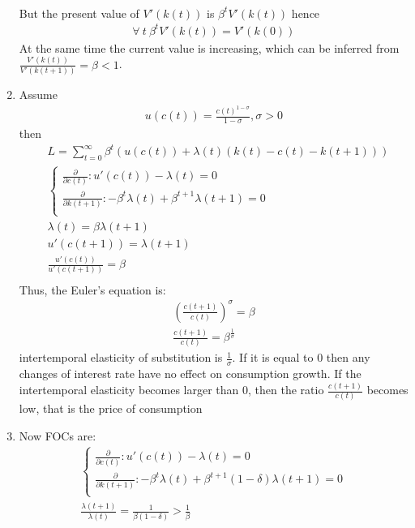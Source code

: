 \documentclass[a4paper]{article}
\begin{document}
\begin{enumerate}
\begin{align*}
	\end{align*}
	But the present value of $V'(k(t))$ is $\beta^t V'(k(t))$ hence 
	\begin{align*}
	\forall\ t\ \beta^t V'(k(t)) = V'(k(0))
	\end{align*}
	At the same time the current value is increasing, which can be inferred from $\frac{V'(k(t))}{V'(k(t+1))} = \beta < 1$.
	\item Assume 
	\begin{align*}
	u(c(t)) = \frac{c(t)^{1 - \sigma}}{1 - \sigma}, \sigma > 0
\end{align*}
then
\begin{align*}
&L = \sum_{t=0}^{\infty} \beta^t(u(c(t)) + \lambda(t)(k(t) - c(t) - k(t+1)))\\
&\begin{cases}\frac{\partial}{\partial c(t)}: u'(c(t)) - \lambda(t) = 0\\
\frac{\partial}{\partial k(t+1)}: -\beta^t \lambda(t) + \beta^{t+1}\lambda(t+1) = 0\\
\end{cases}\\
&\lambda(t) = \beta \lambda(t+1)\\
&u'(c(t+1)) = \lambda(t+1)\\
&\frac{u'(c(t))}{u'(c(t+1))} = \beta\\
\end{align*}
Thus, the Euler's equation is:
\begin{align*}
\left(\frac{c(t+1)}{c(t)}\right)^{\sigma} = \beta\\
\frac{c(t+1)}{c(t)} = \beta^{\frac{1}{\sigma}}
\end{align*}
intertemporal elasticity of substitution is $\frac{1}{\sigma}$. If it is equal to 0 then any changes of interest rate have no effect on consumption growth. If the intertemporal elasticity becomes larger than 0, then the ratio $\frac{c(t+1)}{c(t)}$ becomes low, that is the price of consumption 
\item Now FOCs are:
\begin{align*}
\begin{cases}\frac{\partial}{\partial c(t)}: u'(c(t)) - \lambda(t) = 0\\
\frac{\partial}{\partial k(t+1)}: -\beta^t \lambda(t) + \beta^{t+1}(1 - \delta)\lambda(t+1) = 0\\
\end{cases}\\
\frac{\lambda(t+1)}{\lambda(t)} = \frac{1}{\beta(1 - \delta)} > \frac{1}{\beta}
\end{align*}

\end{enumerate}
\end{document}
